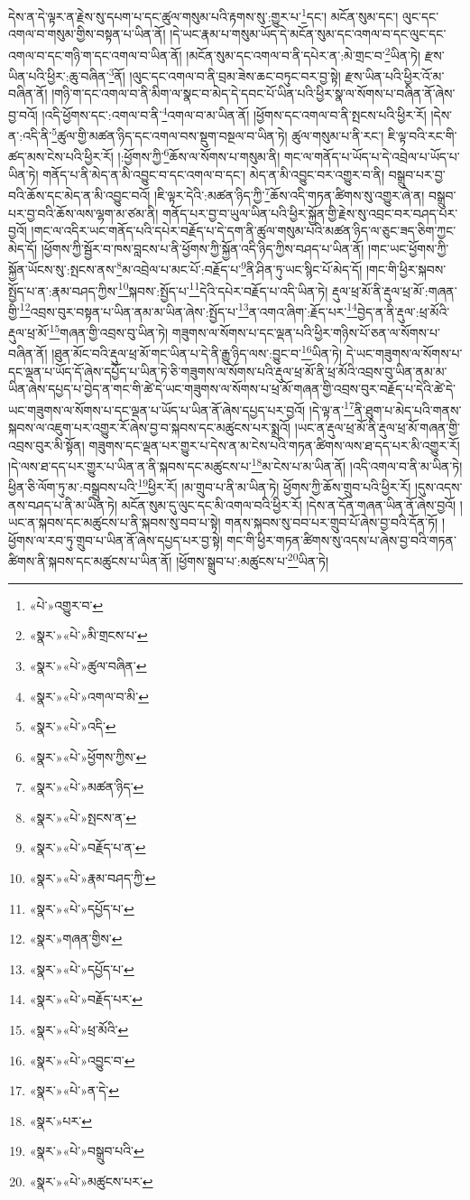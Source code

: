 དེས་ན་དེ་ལྟར་ན་རྗེས་སུ་དཔག་པ་དང་ཚུལ་གསུམ་པའི་རྟགས་སུ་:གྱུར་པ་\footnote{«པེ་»འགྱུར་བ་}དང་། མངོན་སུམ་དང་། ལུང་དང་འགལ་བ་གསུམ་གྱིས་བསྟན་པ་ཡིན་ནོ། །དེ་ཡང་རྣམ་པ་གསུམ་ཡོད་དེ་མངོན་སུམ་དང་འགལ་བ་དང་ལུང་དང་འགལ་བ་དང་གཉི་ག་དང་འགལ་བ་ཡིན་ནོ། །མངོན་སུམ་དང་འགལ་བ་ནི་དཔེར་ན་:མེ་གྲང་བ་\footnote{«སྣར་»«པེ་»མི་གྲངས་པ་}ཡིན་ཏེ། རྫས་ཡིན་པའི་ཕྱིར་:ཆུ་བཞིན་\footnote{«སྣར་»«པེ་»ཚུལ་བཞིན་}ནོ། །ལུང་དང་འགལ་བ་ནི་བྲམ་ཟེས་ཆང་བཏུང་བར་བྱ་སྟེ། རྫས་ཡིན་པའི་ཕྱིར་འོ་མ་བཞིན་ནོ། །གཉི་ག་དང་འགལ་བ་ནི་མིག་ལ་སྣང་བ་མེད་དེ་དབང་པོ་ཡིན་པའི་ཕྱིར་སྣ་ལ་སོགས་པ་བཞིན་ནོ་ཞེས་བྱ་བའོ། །འདི་ཕྱོགས་དང་:འགལ་བ་ནི་\footnote{«སྣར་»«པེ་»འགལ་བ་མི་}འགལ་བ་མ་ཡིན་ནོ། །ཕྱོགས་དང་འགལ་བ་ནི་སྤངས་པའི་ཕྱིར་རོ། །དེས་ན་:འདི་ནི་\footnote{«སྣར་»«པེ་»འདི་}ཚུལ་གྱི་མཚན་ཉིད་དང་འགལ་བས་སྡུག་བསྔལ་བ་ཡིན་ཏེ། ཚུལ་གསུམ་པ་ནི་རང་། ཇི་ལྟ་བའི་རང་གི་ཚད་མས་ངེས་པའི་ཕྱིར་རོ། །:ཕྱོགས་ཀྱི་\footnote{«སྣར་»«པེ་»ཕྱོགས་ཀྱིས་}ཆོས་ལ་སོགས་པ་གསུམ་ནི། གང་ལ་གནོད་པ་ཡོད་པ་དེ་འབྲེལ་པ་ཡོད་པ་ཡིན་ཏེ། གནོད་པ་ནི་མེད་ན་མི་འབྱུང་བ་དང་འགལ་བ་དང་། མེད་ན་མི་འབྱུང་བར་འགྱུར་བ་ནི། བསྒྲུབ་པར་བྱ་བའི་ཆོས་དང་མེད་ན་མི་འབྱུང་བའོ། །ཇི་ལྟར་དེའི་:མཚན་ཉིད་ཀྱི་\footnote{«སྣར་»«པེ་»མཚན་ཉིད་}ཆོས་འདི་གཏན་ཚིགས་སུ་འགྱུར་ཞེ་ན། བསྒྲུབ་པར་བྱ་བའི་ཆོས་ལས་ལྷག་མ་ཙམ་ནི། གནོད་པར་བྱ་བ་ཡུལ་ཡིན་པའི་ཕྱིར་སྐྱོན་གྱི་རྗེས་སུ་འབྲང་བར་བཤད་པར་བྱའོ། །གང་ལ་འདིར་ཡང་གནོད་པའི་དཔེར་བརྗོད་པ་དེ་དག་ནི་ཚུལ་གསུམ་པའི་མཚན་ཉིད་ལ་ཅུང་ཟད་ཅིག་ཀྱང་མེད་དོ། །ཕྱོགས་ཀྱི་སྦྱོར་བ་ཁས་བླངས་པ་ནི་ཕྱོགས་ཀྱི་སྐྱོན་འདི་ཉིད་ཀྱིས་བཤད་པ་ཡིན་ནོ། །གང་ཡང་ཕྱོགས་ཀྱི་སྐྱོན་ཡོངས་སུ་:སྤངས་ནས་\footnote{«སྣར་»«པེ་»སྤངས་ན་}མ་འབྲེལ་པ་མང་པོ་:བརྗོད་པ་\footnote{«སྣར་»«པེ་»བརྗོད་པ་ན་}ནི་ཤིན་ཏུ་ཡང་སྙིང་པོ་མེད་དོ། །གང་གི་ཕྱིར་སྐབས་སྤྱོད་པ་ན་:རྣམ་བཤད་ཀྱིས་\footnote{«སྣར་»«པེ་»རྣམ་བཤད་ཀྱི་}སྐབས་:སྤྱོད་པ་\footnote{«སྣར་»«པེ་»དཔྱོད་པ་}དེའི་དཔེར་བརྗོད་པ་འདི་ཡིན་ཏེ། རྡུལ་ཕྲ་མོ་ནི་རྡུལ་ཕྲ་མོ་:གཞན་གྱི་\footnote{«སྣར་»གཞན་གྱིས་}འབྲས་བུར་བསྟན་པ་ཡིན་ནམ་མ་ཡིན་ཞེས་:སྤྱོད་པ་\footnote{«སྣར་»«པེ་»དཔྱོད་པ་}ན་འགའ་ཞིག་:རྗོད་པར་\footnote{«སྣར་»«པེ་»བརྗོད་པར་}བྱེད་ན་ནི་རྡུལ་:ཕྲ་མོའི་རྡུལ་ཕྲ་མོ་\footnote{«སྣར་»«པེ་»ཕྲ་མོའི་}གཞན་གྱི་འབྲས་བུ་ཡིན་ཏེ། གཟུགས་ལ་སོགས་པ་དང་ལྡན་པའི་ཕྱིར་གཉིས་པོ་ཅན་ལ་སོགས་པ་བཞིན་ནོ། །ཐུན་མོང་བའི་རྡུལ་ཕྲ་མོ་གང་ཡིན་པ་དེ་ནི་རྒྱུ་ཉིད་ལས་:བྱུང་བ་\footnote{«སྣར་»«པེ་»འབྱུང་བ་}ཡིན་ཏེ། དེ་ཡང་གཟུགས་ལ་སོགས་པ་དང་ལྡན་པ་ཡོད་དོ་ཞེས་དཔྱོད་པ་ཡིན་ཏེ་ཅི་གཟུགས་ལ་སོགས་པའི་རྡུལ་ཕྲ་མོ་ནི་ཕྲ་མོའི་འབྲས་བུ་ཡིན་ནམ་མ་ཡིན་ཞེས་དཔྱད་པ་བྱེད་ན་གང་གི་ཚེ་དེ་ཡང་གཟུགས་ལ་སོགས་པ་ཕྲ་མོ་གཞན་གྱི་འབྲས་བུར་བརྗོད་པ་དེའི་ཚེ་དེ་ཡང་གཟུགས་ལ་སོགས་པ་དང་ལྡན་པ་ཡོད་པ་ཡིན་ནོ་ཞེས་དཔྱད་པར་བྱའོ། །དེ་ལྟ་ན་\footnote{«སྣར་»«པེ་»ན་དེ་}ནི་ཐུག་པ་མེད་པའི་གནས་སྐབས་ལ་འཇུག་པར་འགྱུར་རོ་ཞེས་བྱ་བ་སྐབས་དང་མཚུངས་པར་སྨྲའོ། །ཡང་ན་རྡུལ་ཕྲ་མོ་ནི་རྡུལ་ཕྲ་མོ་གཞན་གྱི་འབྲས་བུར་མི་སྟོན། གཟུགས་དང་ལྡན་པར་གྱུར་པ་དེས་ན་མ་ངེས་པའི་གཏན་ཚིགས་ལས་ཐ་དད་པར་མི་འགྱུར་རོ། །དེ་ལས་ཐ་དད་པར་གྱུར་པ་ཡིན་ན་ནི་སྐབས་དང་མཚུངས་པ་\footnote{«སྣར་»པར་}མ་ངེས་པ་མ་ཡིན་ནོ། །འདི་འགལ་བ་ནི་མ་ཡིན་ཏེ། ཕྱིན་ཅི་ལོག་ཏུ་མ་:བསྒྲུབས་པའི་\footnote{«སྣར་»«པེ་»བསྒྲུབ་པའི་}ཕྱིར་རོ། །མ་གྲུབ་པ་ནི་མ་ཡིན་ཏེ། ཕྱོགས་ཀྱི་ཆོས་གྲུབ་པའི་ཕྱིར་རོ། །དུས་འདས་ནས་བཤད་པ་ནི་མ་ཡིན་ཏེ། མངོན་སུམ་དུ་ལུང་དང་མི་འགལ་བའི་ཕྱིར་རོ། །དེས་ན་དོན་གཞན་ཡིན་ནོ་ཞེས་བྱའོ། །ཡང་ན་སྐབས་དང་མཚུངས་པ་ནི་སྐབས་སུ་བབ་པ་སྟེ། གནས་སྐབས་སུ་བབ་པར་གྲུབ་པོ་ཞེས་བྱ་བའི་དོན་ཏོ། །ཕྱོགས་ལ་རབ་ཏུ་གྲུབ་པ་ཡིན་ནོ་ཞེས་དཔྱད་པར་བྱ་སྟེ། གང་གི་ཕྱིར་གཏན་ཚིགས་སུ་འདས་པ་ཞེས་བྱ་བའི་གཏན་ཚིགས་ནི་སྐབས་དང་མཚུངས་པ་ཡིན་ནོ། །ཕྱོགས་སྒྲུབ་པ་:མཚུངས་པ་\footnote{«སྣར་»«པེ་»མཚུངས་པར་}ཡིན་ཏེ། 